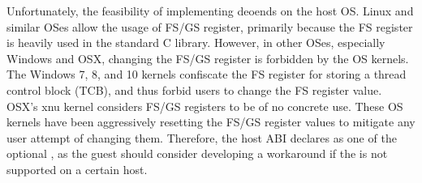 Unfortunately, the feasibility of implementing 
deoends on the host OS.
Linux and similar OSes allow the usage of FS/GS register,
primarily because the FS register is heavily used in the standard C library.
However, in other OSes, especially Windows and OSX,
changing the FS/GS register %
is forbidden by the OS kernels.
The Windows 7, 8, and 10 kernels confiscate the FS register for storing a thread control block (TCB),
and thus forbid users to change the FS register value.
OSX's xnu kernel considers FS/GS registers to be of no concrete use.
These OS kernels
have been aggressively resetting the FS/GS register values
to mitigate any user attempt of changing them.
Therefore, the host ABI declares 
as one of the optional \hostapis{},
as the guest should consider developing a workaround if the \hostapi{} is not supported on a certain host.









